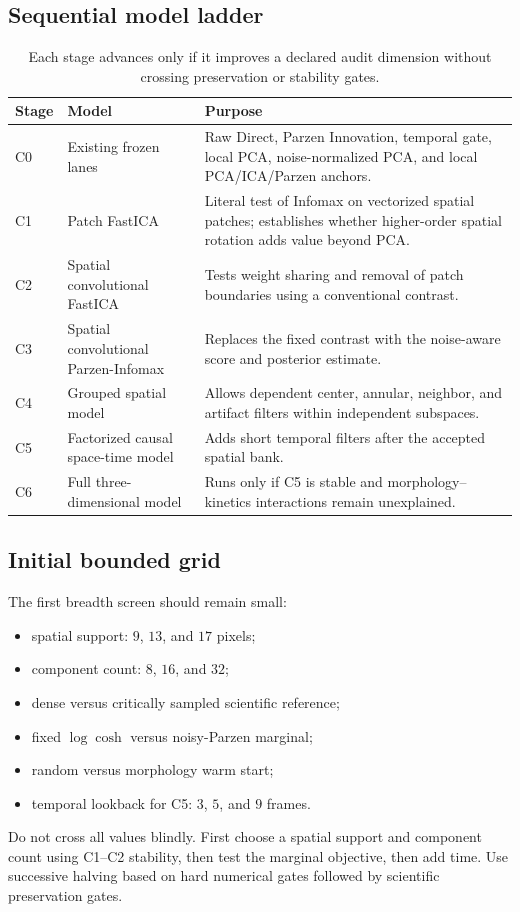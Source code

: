 \documentclass[11pt]{article}
\begin{document}
\subsection{Sequential model ladder}

\begin{table}[H]
\centering
\small
\caption{Each stage advances only if it improves a declared audit dimension
without crossing preservation or stability gates.}
\begin{tabularx}{\textwidth}{@{}p{}p{}X@{}}
\toprule
Stage & Model & Purpose\\
\midrule
C0 & Existing frozen lanes &
Raw Direct, Parzen Innovation, temporal gate, local PCA, noise-normalized PCA,
and local PCA/ICA/Parzen anchors.\\
C1 & Patch FastICA &
Literal test of Infomax on vectorized spatial patches; establishes whether
higher-order spatial rotation adds value beyond PCA.\\
C2 & Spatial convolutional FastICA &
Tests weight sharing and removal of patch boundaries using a conventional
contrast.\\
C3 & Spatial convolutional Parzen-Infomax &
Replaces the fixed contrast with the noise-aware score and posterior estimate.\\
C4 & Grouped spatial model &
Allows dependent center, annular, neighbor, and artifact filters within
independent subspaces.\\
C5 & Factorized causal space-time model &
Adds short temporal filters after the accepted spatial bank.\\
C6 & Full three-dimensional model &
Runs only if C5 is stable and morphology--kinetics interactions remain
unexplained.\\
\bottomrule
\end{tabularx}
\end{table}

\subsection{Initial bounded grid}

The first breadth screen should remain small:
\begin{itemize}[leftmargin=*]
\item spatial support: $9$, $13$, and $17$ pixels;
\item component count: $8$, $16$, and $32$;
\item dense versus critically sampled scientific reference;
\item fixed $\log\cosh$ versus noisy-Parzen marginal;
\item random versus morphology warm start;
\item temporal lookback for C5: $3$, $5$, and $9$ frames.
\end{itemize}
Do not cross all values blindly. First choose a spatial support and component
count using C1--C2 stability, then test the marginal objective, then add time.
Use successive halving based on hard numerical gates followed by scientific
preservation gates.
\end{document}
